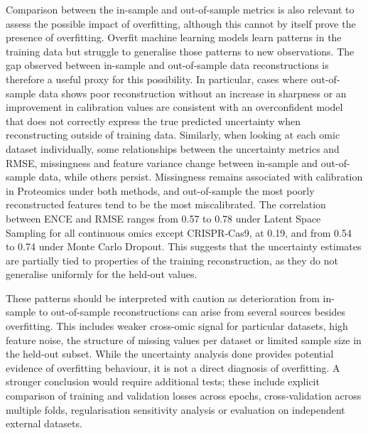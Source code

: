 Comparison between the in-sample and out-of-sample metrics is also relevant to assess the possible impact of overfitting, although this cannot by itself prove the presence of overfitting. Overfit machine learning models learn patterns in the training data but struggle to generalise those patterns to new observations. The gap observed between in-sample and out-of-sample data reconstructions is therefore a useful proxy for this possibility. In particular, cases where out-of-sample data shows poor reconstruction without an increase in sharpness or an improvement in calibration values are consistent with an overconfident model that does not correctly express the true predicted uncertainty when reconstructing outside of training data. Similarly, when looking at each omic dataset individually, some relationships between the uncertainty metrics and RMSE, missingness and feature variance change between in-sample and out-of-sample data, while others persist. Missingness remains associated with calibration in Proteomics under both methods, and out-of-sample the most poorly reconstructed features tend to be the most miscalibrated. The correlation between ENCE and RMSE ranges from 0.57 to 0.78 under Latent Space Sampling for all continuous omics except CRISPR-Cas9, at 0.19, and from 0.54 to 0.74 under Monte Carlo Dropout. This suggests that the uncertainty estimates are partially tied to properties of the training reconstruction, as they do not generalise uniformly for the held-out values.

These patterns should be interpreted with caution as deterioration from in-sample to out-of-sample reconstructions can arise from several sources besides overfitting. This includes weaker cross-omic signal for particular datasets, high feature noise, the structure of missing values per dataset or limited sample size in the held-out subset. While the uncertainty analysis done provides potential evidence of overfitting behaviour, it is not a direct diagnosis of overfitting. A stronger conclusion would require additional tests; these include explicit comparison of training and validation losses across epochs, cross-validation across multiple folds, regularisation sensitivity analysis or evaluation on independent external datasets.